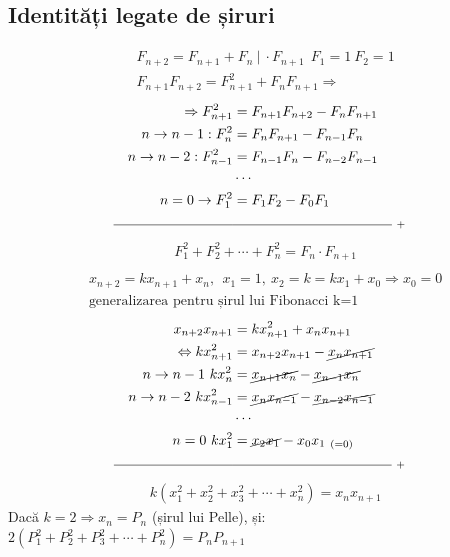 \documentclass[12pt]{article}
\theoremstyle{definition}
\begin{document}
\subsection*{Identități legate de șiruri}
\[\begin{aligned}
&F_{n+2}=F_{n+1}+F_n \ |\ \cdot F_{n+1} \ \ F_1=1 \ F_2=1\\
&F_{n+1}F_{n+2}=F^2_{n+1} + F_n F_{n+1} \Rightarrow
\end{aligned}\]
\[\begin{aligned}
\Rightarrow F^2_{n+1}&=F_{n+1}F_{n+2} - F_n F_{n+1}\\
n\rightarrow n-1: F^2_{n}&=F_{n}F_{n+1} - F_{n-1} F_{n}\\
n\rightarrow n-2: F^2_{n-1}&=F_{n-1}F_{n} - F_{n-2} F_{n-1}\\
&\cdots \\
n=0 \rightarrow F^2_{1} &= F_1F_2-F_0F_1\\
\rule{3cm}{0.4pt}&\rule{4cm}{0.4pt}\ _+\\
\end{aligned}\]
\[\begin{aligned}
&\boxed{F^2_1+F^2_2+\cdots+F^2_n=F_n\cdot F_{n+1}}\\
\end{aligned}\]
\[
\begin{aligned}
&x_{n+2}=kx_{n+1}+x_n, \ \ x_1=1, \ x_2=k=kx_1+x_0 \Rightarrow x_0=0\\
&\text{generalizarea pentru șirul lui Fibonacci k=1}
\end{aligned}\]
\[\begin{aligned}
x_{n+2}x_{n+1} &= kx^2_{n+1} +x_nx_{n+1}\\
\Leftrightarrow kx^2_{n+1} &= x_{n+2}x_{n+1} - \cancel{x_nx_{n+1}}\\
n \rightarrow n-1\ kx^2_{n} &= \cancel{x_{n+1}x_{n}} - \cancel{x_{n-1}x_{n}}\\
n \rightarrow n-2\ kx^2_{n-1} &= \cancel{x_{n}x_{n-1}} - \cancel{x_{n-2}x_{n-1}}\\
&\cdots\\
n = 0\ kx^2_{1} &= \cancel{x_{2}x_{1}} - x_{0}x_{1}\ _{(=0)}\\
\rule{3cm}{0.4pt}&\rule{4cm}{0.4pt}\ _+
\end{aligned}
\]
\[\begin{aligned}
&\boxed{k(x^2_1 + x^2_2 + x^2_3 + \cdots + x^2_n)=x_n x_{n+1}} 
\end{aligned}\]
Dacă $k=2 \Rightarrow x_n = P_n $ (șirul lui Pelle), și:\\
$2(P^2_1 + P^2_2 + P^2_3 + \cdots + P^2_n)=P_n P_{n+1}$
\end{document}
